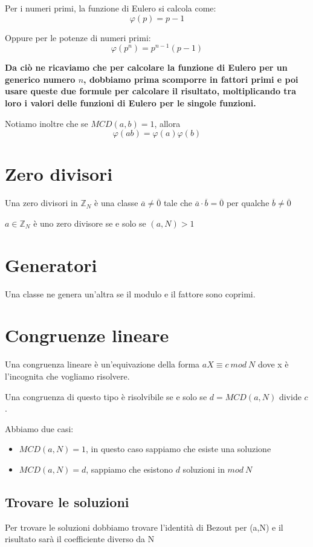 \documentclass[a4paper, 10pt]{article}
\begin{document}
Per i numeri primi, la funzione di Eulero si calcola come: $$\varphi(p) = p - 1$$

Oppure per le potenze di numeri primi: $$\varphi(p^n) = p^{n - 1}(p-1) $$

\textbf{Da ciò ne ricaviamo che per calcolare la funzione di Eulero per un generico numero $n$, dobbiamo prima scomporre in fattori primi e poi usare queste due formule per calcolare il risultato, moltiplicando tra loro i valori delle funzioni di Eulero per le singole funzioni.}

Notiamo inoltre che se $MCD(a,b) = 1$, allora $$\varphi(ab) = \varphi(a)\varphi(b)$$

\section{Zero divisori}

Una zero divisori in $\mathbb{Z}_N$ è una classe $\overline{a} \neq \overline{0}$ tale che $\overline{a} \cdot \overline{b} = \overline{0}$ per qualche $\overline{b} \neq \overline{0}$

$a \in \mathbb{Z}_N$ è uno zero divisore se e solo se $(a,N) > 1$

\section{Generatori}

Una classe ne genera un'altra se il modulo e il fattore sono coprimi.

\section{Congruenze lineare}

Una congruenza lineare è un'equivazione della forma $aX \equiv c\ mod\ N$ dove x è l'incognita che vogliamo risolvere.

Una congruenza di questo tipo è risolvibile se e solo se $d=MCD(a,N)$ divide $c$.

Abbiamo due casi:

\begin{itemize}
	\item $MCD(a,N) = 1$, in questo caso sappiamo che esiste una soluzione
	\item $MCD(a,N) = d$, sappiamo che esistono $d$ soluzioni in $mod\ N$ 
\end{itemize}

\subsection{Trovare le soluzioni}

Per trovare le soluzioni dobbiamo trovare l'identità di Bezout per (a,N) e il risultato sarà il coefficiente diverso da N
\end{document}
